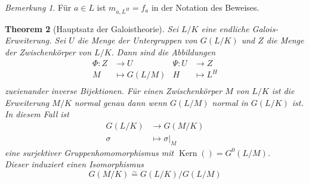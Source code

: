 \documentclass[10pt,a4paper]{article}
\newcommand{\isom}{\overset{\sim}{=}}
\newcommand{\Kern}{\operatorname{Kern}}
\theoremstyle{plain}
\newtheorem{theorem}{Theorem}[section]
\theoremstyle{definition}
\theoremstyle{remark}
\newtheorem{bem}[theorem]{Bemerkung}
\begin{document}
	\begin{bem}
		Für $a\in  L$ ist $m_{a,L^H}=f_a$ in der Notation des Beweises.
	\end{bem}
	
	\begin{theorem}[Hauptsatz der Galoistheorie]\label{satz:hsGal}
		Sei $L/K$ eine endliche Galois-Erweiterung. Sei $U$ die Menge der Untergruppen von $G(L/K)$ und $Z$ die Menge der Zwischenkörper von $L/K$. Dann sind die Abbildungen
		\begin{align*}
		\Phi:Z&\to U&\Psi:U&\to Z\\
		M&\mapsto G(L/M)&H&\mapsto L^H\\
		\end{align*}
		zueienander inverse Bijektionen. Für einen Zwischenkörper $M$ von $L/K$ ist die Erweiterung $M/K$ normal genau dann wenn $G(L/M)$ normal in $G(L/K)$ ist.\\
		In diesem Fall ist
		\begin{align*}
		G(L/K)&\to G(M/K)\\
		\sigma&\mapsto\sigma|_M
		\end{align*}
		eine surjektiver Gruppenhomomorphismus mit $\Kern()=G^0(L/M)$.\\
		Dieser induziert einen Isomorphismus
		\[G(M/K)\isom G(L/K)/G(L/M)\]
	\end{theorem}
\end{document}
